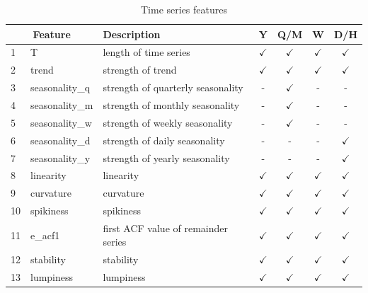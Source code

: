 \documentclass[11pt,a4paper,]{article}
\def\yes{$\checkmark$}
\begin{document}
\begin{table}[!htp]
\centering\footnotesize\tabcolsep=0.12cm
\caption{Time series features}
\label{feature}
\begin{tabular}{llp{}cccc}
\toprule
\multicolumn{2}{c}{Feature} & Description & Y & Q/M & W & D/H\\
\midrule
1  & T              & length of time series                                                                   & \yes  & \yes & \yes & \yes\\
2  & trend          & strength of trend                                                                       & \yes  & \yes & \yes & \yes\\
3  & seasonality\_q    & strength of quarterly seasonality                                                    & -     & \yes & - & -\\
4  & seasonality\_m    & strength of monthly seasonality                                                      & -     & \yes & - & -\\
5  & seasonality\_w    & strength of weekly seasonality                                                       & -     & \yes & - & - \\
6  & seasonality\_d    & strength of daily seasonality                                                        & -     & - & - & \yes\\
7  & seasonality\_y    & strength of yearly seasonality                                                       & -     & - & - & \yes\\
8  & linearity      & linearity                                                                               & \yes  & \yes & \yes & \yes\\
9  & curvature      & curvature                                                                               & \yes  & \yes & \yes & \yes\\
10  & spikiness      & spikiness                                                                               & \yes  & \yes & \yes & \yes\\
11  & e\_acf1        & first ACF value of remainder series                                                     & \yes  & \yes & \yes & \yes\\
12  & stability      & stability                                                                               & \yes  & \yes & \yes & \yes\\
13  & lumpiness      & lumpiness                                                                               & \yes  & \yes & \yes & \yes\\

\end{tabular}
\end{table}
\end{document}
